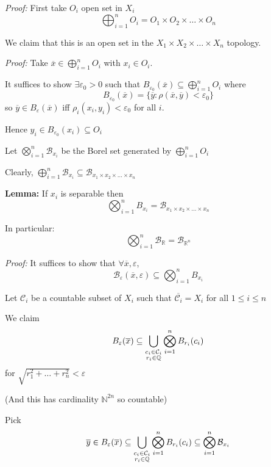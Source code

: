 \documentclass[12pt]{report}
\newcommand{\R}{\mathbb{R}}
\newcommand{\N}{\mathbb{N}}
\newcommand{\Q}{\mathbb{Q}}
\newcommand{\ep}{\varepsilon}
\newcommand{\B}{\mathcal{B}}
\newcommand{\sub}{\subseteq}
\renewcommand{\bar}[1]{\overline{#1}}
\newenvironment*{tbox}[2][gray]{
    \begin{tcolorbox}[
        parbox=false,
        colback=#1!5!white,
        colframe=#1!75!black,
        breakable,
        title={#2}
    ]}
    {\end{tcolorbox}}
\newenvironment*{proof}[1][blue]{
\begin{tcolorbox}[
    parbox=false,
    colback=#1!5!white,
    colframe=#1!75!black,
    breakable
]}
{\end{tcolorbox}}
\begin{document}
    \begin{tbox}{\textbf{Proposition:} $B_{\R^n}$ is  }
        \emph{Proof:} First take $O_i$ open set in $X_i$ 
        \[\bigoplus_{i=1}^n O_i = O_1 \times O_2 \times \dots \times O_n \]

        We claim that this is an open set in the $X_1 \times X_2 \times \dots \times X_n$ topology.

        \begin{proof}
            \emph{Proof:} Take $\bar x \in \bigoplus_{i=1}^n O_i$ with $x_i \in O_i$. 

            It suffices to show $\exists \ep_0 > 0$ such that $B_{\ep_0}(\bar x) \sub \bigoplus_{i=1}^n O_i$ where 
            \[B_{\ep_0}(\bar x) = \{\bar y: \rho(\bar x, \bar y) < \ep_0\}\]
            so $\bar y \in B_{\ep}(\bar x)$ iff $\rho_i(x_i, y_i) < \ep_0$ for all $i$.

            Hence $y_i \in B_{\ep_0}(x_i) \sub O_i$
        \end{proof}

        Let $\bigotimes_{i=1}^n \B_{x_i}$ be the Borel set generated by $\bigoplus_{i=1}^n O_i$

        Clearly, $\bigoplus_{i=1}^n \B_{x_i} \sub \B_{x_1 \times x_2 \times \dots \times x_n}$
        
        \textbf{Lemma:} If $x_i$ is separable then 
        \[\bigotimes_{i=1}^n B_{x_i} = \B_{x_1 \times x_2 \times \dots\times x_n}\]

        In particular: 
        \[\bigotimes_{i=1}^n \B_{\R} = \B_{\R^n}\]

        \begin{proof}
            \emph{Proof:} It suffices to show that $\forall \bar x, \ep$, 
            \[\B_{\ep}(\bar x, \ep) \sub \bigotimes_{i=1}^n B_{x_i}\]

            Let $\mathcal{C}_i$ be a countable subset of $X_i$ such that $\bar{\mathcal{C}_i} = X_i$ for all $1 \leq i \leq n$

            We claim 
            \[B_{\ep}(\bar x) \sub \bigcup_{\begin{subarray}{c} c_i \in \mathcal{C}_i \\ r_i \in \Q \end{subarray}} \bigotimes_{i=1}^n B_{r_i}(c_i)\]
            for $\sqrt{r_1^2 + \dots + r_n^2} < \ep$

            (And this has cardinality $\N^{2n}$ so countable)

            Pick 
            \[\bar y \in B_{\ep}(\bar x) \sub \bigcup_{\begin{subarray}{c} c_i \in \mathcal{C}_i \\ r_i \in \Q \end{subarray}} \bigotimes_{i=1}^n B_{r_i}(c_i) \sub \bigotimes_{i=1}^n \B_{x_i}\] 


\end{proof}
\end{tbox}
\end{document}
